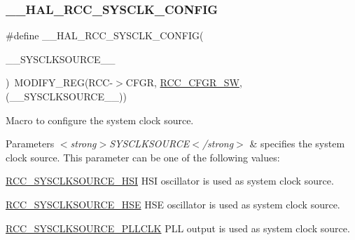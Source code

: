 \subsubsection{\texorpdfstring{\+\_\+\+\_\+\+H\+A\+L\+\_\+\+R\+C\+C\+\_\+\+S\+Y\+S\+C\+L\+K\+\_\+\+C\+O\+N\+F\+IG}{\_\_HAL\_RCC\_SYSCLK\_CONFIG}}
{\footnotesize\ttfamily \#define \+\_\+\+\_\+\+H\+A\+L\+\_\+\+R\+C\+C\+\_\+\+S\+Y\+S\+C\+L\+K\+\_\+\+C\+O\+N\+F\+IG(\begin{DoxyParamCaption}\item[{}]{\+\_\+\+\_\+\+S\+Y\+S\+C\+L\+K\+S\+O\+U\+R\+C\+E\+\_\+\+\_\+ }\end{DoxyParamCaption})~M\+O\+D\+I\+F\+Y\+\_\+\+R\+EG(R\+CC-\/$>$C\+F\+GR, \hyperlink{group___peripheral___registers___bits___definition_ga0eea5e5f7743a7e8995b8beeb18355c1}{R\+C\+C\+\_\+\+C\+F\+G\+R\+\_\+\+SW}, (\+\_\+\+\_\+\+S\+Y\+S\+C\+L\+K\+S\+O\+U\+R\+C\+E\+\_\+\+\_\+))}



Macro to configure the system clock source. 


\begin{DoxyParams}{Parameters}
{\em $<$strong$>$\+S\+Y\+S\+C\+L\+K\+S\+O\+U\+R\+C\+E$<$/strong$>$} & specifies the system clock source. This parameter can be one of the following values\+: \begin{DoxyItemize}
\item \hyperlink{group___r_c_c___system___clock___source_gaaeeb699502e7d7a9f1b5d57fcf1f5095}{R\+C\+C\+\_\+\+S\+Y\+S\+C\+L\+K\+S\+O\+U\+R\+C\+E\+\_\+\+H\+SI} H\+SI oscillator is used as system clock source. \item \hyperlink{group___r_c_c___system___clock___source_ga9116d0627e1e7f33c48e1357b9a35a1c}{R\+C\+C\+\_\+\+S\+Y\+S\+C\+L\+K\+S\+O\+U\+R\+C\+E\+\_\+\+H\+SE} H\+SE oscillator is used as system clock source. \item \hyperlink{group___r_c_c___system___clock___source_ga5caf08ac71d7dd7e7b2e3e421606aca7}{R\+C\+C\+\_\+\+S\+Y\+S\+C\+L\+K\+S\+O\+U\+R\+C\+E\+\_\+\+P\+L\+L\+C\+LK} P\+LL output is used as system clock source. \end{DoxyItemize}
\\
\hline
\end{DoxyParams}

